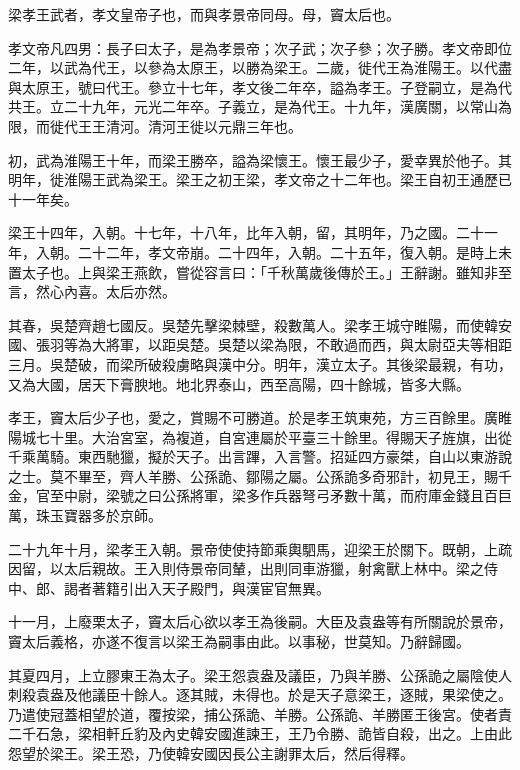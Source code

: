 
\begin{pinyinscope}
梁孝王武者，孝文皇帝子也，而與孝景帝同母。母，竇太后也。

孝文帝凡四男：長子曰太子，是為孝景帝；次子武；次子參；次子勝。孝文帝即位二年，以武為代王，以參為太原王，以勝為梁王。二歲，徙代王為淮陽王。以代盡與太原王，號曰代王。參立十七年，孝文後二年卒，謚為孝王。子登嗣立，是為代共王。立二十九年，元光二年卒。子義立，是為代王。十九年，漢廣關，以常山為限，而徙代王王清河。清河王徙以元鼎三年也。

初，武為淮陽王十年，而梁王勝卒，謚為梁懷王。懷王最少子，愛幸異於他子。其明年，徙淮陽王武為梁王。梁王之初王梁，孝文帝之十二年也。梁王自初王通歷已十一年矣。

梁王十四年，入朝。十七年，十八年，比年入朝，留，其明年，乃之國。二十一年，入朝。二十二年，孝文帝崩。二十四年，入朝。二十五年，復入朝。是時上未置太子也。上與梁王燕飲，嘗從容言曰：「千秋萬歲後傳於王。」王辭謝。雖知非至言，然心內喜。太后亦然。

其春，吳楚齊趙七國反。吳楚先擊梁棘壁，殺數萬人。梁孝王城守睢陽，而使韓安國、張羽等為大將軍，以距吳楚。吳楚以梁為限，不敢過而西，與太尉亞夫等相距三月。吳楚破，而梁所破殺虜略與漢中分。明年，漢立太子。其後梁最親，有功，又為大國，居天下膏腴地。地北界泰山，西至高陽，四十餘城，皆多大縣。

孝王，竇太后少子也，愛之，賞賜不可勝道。於是孝王筑東苑，方三百餘里。廣睢陽城七十里。大治宮室，為複道，自宮連屬於平臺三十餘里。得賜天子旌旗，出從千乘萬騎。東西馳獵，擬於天子。出言蹕，入言警。招延四方豪桀，自山以東游說之士。莫不畢至，齊人羊勝、公孫詭、鄒陽之屬。公孫詭多奇邪計，初見王，賜千金，官至中尉，梁號之曰公孫將軍，梁多作兵器弩弓矛數十萬，而府庫金錢且百巨萬，珠玉寶器多於京師。

二十九年十月，梁孝王入朝。景帝使使持節乘輿駟馬，迎梁王於關下。既朝，上疏因留，以太后親故。王入則侍景帝同輦，出則同車游獵，射禽獸上林中。梁之侍中、郎、謁者著籍引出入天子殿門，與漢宦官無異。

十一月，上廢栗太子，竇太后心欲以孝王為後嗣。大臣及袁盎等有所關說於景帝，竇太后義格，亦遂不復言以梁王為嗣事由此。以事秘，世莫知。乃辭歸國。

其夏四月，上立膠東王為太子。梁王怨袁盎及議臣，乃與羊勝、公孫詭之屬陰使人刺殺袁盎及他議臣十餘人。逐其賊，未得也。於是天子意梁王，逐賊，果梁使之。乃遣使冠蓋相望於道，覆按梁，捕公孫詭、羊勝。公孫詭、羊勝匿王後宮。使者責二千石急，梁相軒丘豹及內史韓安國進諫王，王乃令勝、詭皆自殺，出之。上由此怨望於梁王。梁王恐，乃使韓安國因長公主謝罪太后，然后得釋。


\end{pinyinscope}
